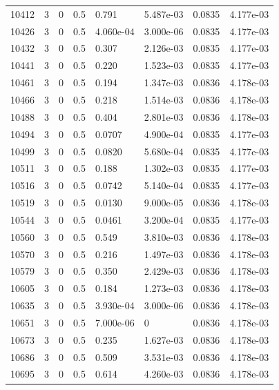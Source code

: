 \documentclass[preview]{standalone}
\begin{document}
{{{{{{{{{{{\begin{tabular}{L{1.2cm}C{1.2cm} C{0.3cm}C{0.5cm} C{1.4cm}C{1.4cm} C{1.4cm}C{1.4cm}}
  10412  &     3  & 0     & 0.5 &  0.791  & 5.487e-03  & 0.0835 &  4.177e-03   \\ 
  10426  &     3  & 0     & 0.5 &  4.060e-04  & 3.000e-06  & 0.0835 &  4.177e-03   \\ 
  10432  &     3  & 0     & 0.5 &  0.307  & 2.126e-03  & 0.0835 &  4.177e-03   \\ 
  10441  &     3  & 0     & 0.5 &  0.220  & 1.523e-03  & 0.0835 &  4.177e-03   \\ 
  10461  &     3  & 0     & 0.5 &  0.194  & 1.347e-03  & 0.0836 &  4.178e-03   \\ 
  10466  &     3  & 0     & 0.5 &  0.218  & 1.514e-03  & 0.0836 &  4.178e-03   \\ 
  10488  &     3  & 0     & 0.5 &  0.404  & 2.801e-03  & 0.0836 &  4.178e-03   \\ 
  10494  &     3  & 0     & 0.5 &  0.0707  & 4.900e-04  & 0.0835 &  4.177e-03   \\ 
  10499  &     3  & 0     & 0.5 &  0.0820  & 5.680e-04  & 0.0835 &  4.177e-03   \\ 
  10511  &     3  & 0     & 0.5 &  0.188  & 1.302e-03  & 0.0835 &  4.177e-03   \\ 
  10516  &     3  & 0     & 0.5 &  0.0742  & 5.140e-04  & 0.0835 &  4.177e-03   \\ 
  10519  &     3  & 0     & 0.5 &  0.0130  & 9.000e-05  & 0.0836 &  4.178e-03   \\ 
  10544  &     3  & 0     & 0.5 &  0.0461  & 3.200e-04  & 0.0835 &  4.177e-03   \\ 
  10560  &     3  & 0     & 0.5 &  0.549  & 3.810e-03  & 0.0836 &  4.178e-03   \\ 
  10570  &     3  & 0     & 0.5 &  0.216  & 1.497e-03  & 0.0836 &  4.178e-03   \\ 
  10579  &     3  & 0     & 0.5 &  0.350  & 2.429e-03  & 0.0836 &  4.178e-03   \\ 
  10605  &     3  & 0     & 0.5 &  0.184  & 1.273e-03  & 0.0836 &  4.178e-03   \\ 
  10635  &     3  & 0     & 0.5 &  3.930e-04  & 3.000e-06  & 0.0836 &  4.178e-03   \\ 
  10651  &     3  & 0     & 0.5 &  7.000e-06  & 0  & 0.0836 &  4.178e-03   \\ 
  10673  &     3  & 0     & 0.5 &  0.235  & 1.627e-03  & 0.0836 &  4.178e-03   \\ 
  10686  &     3  & 0     & 0.5 &  0.509  & 3.531e-03  & 0.0836 &  4.178e-03   \\ 
  10695  &     3  & 0     & 0.5 &  0.614  & 4.260e-03  & 0.0836 &  4.178e-03   \\ 

\end{tabular}}}}}}}}}}}}
\end{document}
